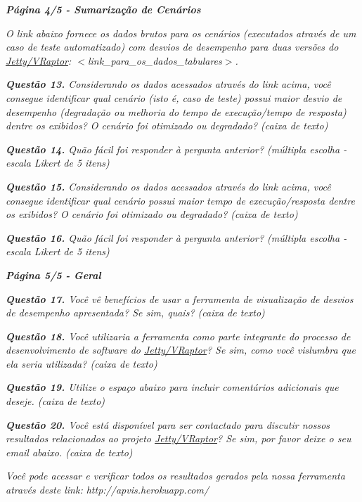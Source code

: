 \begin{framed}
	\noindent \textit{\textbf{Página 4/5 - Sumarização de Cenários}}
	\par
	\noindent \textit{O link abaixo fornece os dados brutos para os cenários (executados através de um caso de teste automatizado) com desvios de desempenho para duas versões do \underline{Jetty/VRaptor}: {\(<\)}link\_para\_os\_dados\_tabulares{\(>\)}.}
	\par
	\noindent \textit{\textbf{Questão 13.} Considerando os dados acessados através do link acima, você consegue identificar qual cenário (isto é, caso de teste) possui maior desvio de desempenho (degradação ou melhoria do tempo de execução/tempo de resposta) dentre os exibidos? O cenário foi otimizado ou degradado? (caixa de texto)}
	\par
	\noindent \textit{\textbf{Questão 14.} Quão fácil foi responder à pergunta anterior? (múltipla escolha - escala Likert de 5 itens)}
	\par
	\noindent \textit{\textbf{Questão 15.} Considerando os dados acessados através do link acima, você consegue identificar qual cenário possui maior tempo de execução/resposta dentre os exibidos? O cenário foi otimizado ou degradado? (caixa de texto)}
	\par
	\noindent \textit{\textbf{Questão 16.} Quão fácil foi responder à pergunta anterior? (múltipla escolha - escala Likert de 5 itens)}
\end{framed}

\begin{framed}
	\noindent \textit{\textbf{Página 5/5 - Geral}}
	\par
	\noindent \textit{\textbf{Questão 17.} Você vê benefícios de usar a ferramenta de visualização de desvios de desempenho apresentada? Se sim, quais? (caixa de texto)}
	\par
	\noindent \textit{\textbf{Questão 18.} Você utilizaria a ferramenta como parte integrante do processo de desenvolvimento de software do \underline{Jetty/VRaptor}? Se sim, como você vislumbra que ela seria utilizada? (caixa de texto)}
	\par
	\noindent \textit{\textbf{Questão 19.} Utilize o espaço abaixo para incluir comentários adicionais que deseje. (caixa de texto)}
	\par
	\noindent \textit{\textbf{Questão 20.} Você está disponível para ser contactado para discutir nossos resultados relacionados ao projeto \underline{Jetty/VRaptor}? Se sim, por favor deixe o seu email abaixo. (caixa de texto)}

	\noindent \textit{Você pode acessar e verificar todos os resultados gerados pela nossa ferramenta através deste link: http://apvis.herokuapp.com/}
\end{framed}

